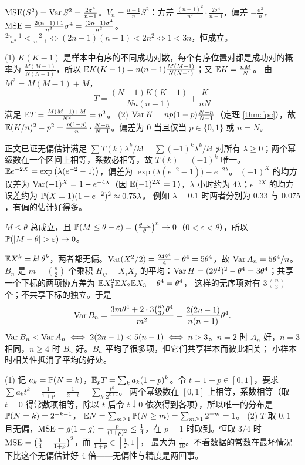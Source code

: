 $\MSE(S^2)=\Var S^2=\frac{2\sigma^4}{n-1}$。$V_n=\frac{n-1}nS^2$：方差 $\frac{(n-1)^2}{n^2}\cdot\frac{2\sigma^4}{n-1}$，偏差 $-\frac{\sigma^2}{n}$，
$\MSE=\frac{2(n-1)+1}{n^2}\sigma^4=\frac{(2n-1)\sigma^4}{n^2}$。$\frac{2n-1}{n^2}<\frac2{n-1}\iff(2n-1)(n-1)<2n^2\iff1<3n$，恒成立。

(1) $K(K-1)$ 是样本中有序的不同成功对数，每个有序位置对都是成功对的概率为 $\frac{M(M-1)}{N(N-1)}$，所以 $\E K(K-1)=n(n-1)\frac{M(M-1)}{N(N-1)}$；又 $\E K=\frac{nM}{N}$。
由 $M^2=M(M-1)+M$，
\[
T=\frac{(N-1)K(K-1)}{Nn(n-1)}+\frac{K}{nN}
\]
满足 $\E T=\frac{M(M-1)+M}{N^2}=p^2$。
(2) $\Var K=np(1-p)\frac{N-n}{N-1}$（定理 \ref{thm:fpc}），故 $\E(K/n)^2-p^2=\frac{p(1-p)}{n}\cdot\frac{N-n}{N-1}$。偏差为 $0$ 当且仅当 $p\in\{0,1\}$ 或 $n=N$。

正文已证无偏估计满足 $\sum T(k)\lambda^k/k!=\sum(-1)^k\lambda^k/k!$ 对所有 $\lambda\ge0$；两个幂级数在一个区间上相等，系数必相等，故 $T(k)=(-1)^k$ 唯一。
$\E e^{-2X}=\exp\big(\lambda(e^{-2}-1)\big)$，偏差为 $\exp\big(\lambda(e^{-2}-1)\big)-e^{-2\lambda}$。
$(-1)^X$ 的均方误差为 $\Var(-1)^X=1-e^{-4\lambda}$（因 $\E(-1)^{2X}=1$），$\lambda$ 小时约为 $4\lambda$；$e^{-2X}$ 的均方误差约为 $\P(X=1)(1-e^{-2})^2\approx0.75\lambda$。
例如 $\lambda=0.1$ 时两者分别为 $0.33$ 与 $0.075$，有偏的估计好得多。

$M\le\theta$ 总成立，且 $\P(M\le\theta-\varepsilon)=\big(\frac{\theta-\varepsilon}{\theta}\big)^n\to0$（$0<\varepsilon<\theta$），所以 $\P(|M-\theta|>\varepsilon)\to0$。

$\E X^k=k!\,\theta^k$，两者都无偏。$\Var(X^2/2)=\frac{24\theta^4}{4}-\theta^4=5\theta^4$，故 $\Var A_n=5\theta^4/n$。
$B_n$ 是 $m=\binom n2$ 个乘积 $H_{ij}=X_iX_j$ 的平均：$\Var H=(2\theta^2)^2-\theta^4=3\theta^4$；共享一个下标的两项协方差为 $\E X_1^2\E X_2\E X_3-\theta^4=\theta^4$，
这样的无序项对有 $3\binom n3$ 个；不共享下标的独立。于是
\[
\Var B_n=\frac{3m\theta^4+2\cdot3\binom n3\theta^4}{m^2}=\frac{2(2n-1)}{n(n-1)}\theta^4 .
\]
$\Var B_n<\Var A_n\iff2(2n-1)<5(n-1)\iff n>3$。$n=2$ 时 $A_n$ 好，$n=3$ 相同，$n\ge4$ 时 $B_n$ 好。$B_n$ 平均了很多项，但它们共享样本而彼此相关；
小样本时相关性抵消了平均的好处。

(1) 记 $a_k=\P(N=k)$，$\E_pT=\sum_ka_k(1-p)^k$。令 $t=1-p\in[0,1]$，要求 $\sum a_kt^k=\frac1{1+p}=\frac1{2-t}=\sum_k\frac{t^k}{2^{k+1}}$。
两个幂级数在 $[0,1]$ 上相等，系数相等（取 $t=0$ 得常数项相等，除以 $t$ 后令 $t\downarrow0$ 依次得到各项），所以唯一的分布是 $\P(N=k)=2^{-k-1}$，
$\E N=\sum_{m\ge1}\P(N\ge m)=\sum_{m\ge1}2^{-m}=1$。
(2) $T$ 取 $0,1$ 且无偏，$\MSE=g(1-g)=\frac{p}{(1+p)^2}\le\frac14$，在 $p=1$ 时取到。恒取 $3/4$ 时 $\MSE=\big(\frac34-\frac1{1+p}\big)^2$，而 $\frac1{1+p}\in[\frac12,1]$，
最大为 $\frac1{16}$。不看数据的常数在最坏情况下比这个无偏估计好 4 倍——无偏性与精度是两回事。


